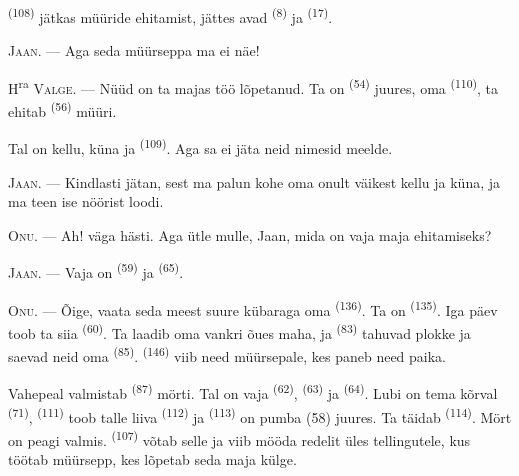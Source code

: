  \textsuperscript{(108)} jätkas müüride ehitamist, jättes avad
 \textsuperscript{(8)} ja  \textsuperscript{(17)}.

\textsc{Jaan}. --- Aga seda müürseppa ma ei näe!

H\textsuperscript{ra} \textsc{Valge}. --- Nüüd on ta majas töö lõpetanud. Ta on
 \textsuperscript{(54)} juures, oma 
\textsuperscript{(110)}, ta ehitab  \textsuperscript{(56)} müüri.

Tal on kellu, küna ja  \textsuperscript{(109)}. Aga sa ei jäta neid nimesid
meelde.

\textsc{Jaan}. --- Kindlasti jätan, sest ma palun kohe oma onult väikest kellu ja küna,
ja ma teen ise nöörist loodi.

\VUsaut{3.0mm}
\VUsaut{3.0mm}

\textsc{Onu}. --- Ah! väga hästi. Aga ütle mulle, Jaan, mida on vaja maja ehitamiseks?

\textsc{Jaan}. --- Vaja on  \textsuperscript{(59)} ja
 \textsuperscript{(65)}.

\textsc{Onu}. --- Õige, vaata seda meest suure kübaraga oma 
\textsuperscript{(136)}. Ta on  \textsuperscript{(135)}. Iga päev toob ta
siia  \textsuperscript{(60)}. Ta laadib oma vankri õues maha, ja
 \textsuperscript{(83)} tahuvad plokke ja saevad neid oma
 \textsuperscript{(85)}.  \textsuperscript{(146)}
viib need müürsepale, kes paneb need paika.

Vahepeal valmistab  \textsuperscript{(87)} mörti. Tal on vaja
 \textsuperscript{(62)},  \textsuperscript{(63)} ja
 \textsuperscript{(64)}. Lubi on tema kõrval 
\textsuperscript{(71)},  \textsuperscript{(111)} toob talle liiva
 \textsuperscript{(112)} ja  \textsuperscript{(113)} on pumba
(58) juures. Ta täidab  \textsuperscript{(114)}. Mört on peagi valmis.
 \textsuperscript{(107)} võtab selle ja viib mööda redelit üles
tellingutele, kus töötab müürsepp, kes lõpetab seda maja külge.

